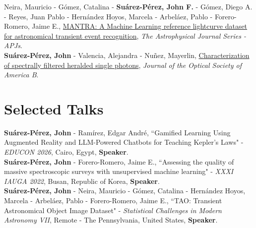 \documentclass[10pt, a4paper]{article}
\newcommand{\years}[1]{\marginnote{\scriptsize #1}}
\begin{document}
\years{2020}Neira, Mauricio - Gómez, Catalina - \textbf{Suárez-Pérez, John F.} - Gómez, Diego A. - Reyes, Juan Pablo - Hernández Hoyos, Marcela - Arbeláez, Pablo - Forero-Romero, Jaime E., \href{https://iopscience.iop.org/article/10.3847/1538-4365/aba267/pdf}{MANTRA: A Machine Learning reference lightcurve dataset for astronomical transient event recognition}, \emph{The Astrophysical Journal Series - APJs}.
\\

\years{2020}\textbf{Suárez-Pérez, John} - Valencia, Alejandra - Nuñez, Mayerlin, \href{https://doi.org/10.1364/JOSAB.387118}{Characterization of spectrally filtered heralded single photons}, \emph{Journal of the Optical Society of America B}.

\section*{Selected Talks}

\years{2026}\textbf{Suárez-Pérez, John} - Ramírez, Edgar André, “Gamified Learning Using Augmented Reality and LLM-Powered Chatbots for Teaching Kepler's Laws" - \emph{EDUCON 2026},  Cairo, Egypt, \textbf{Speaker}.\\

\years{2022}\textbf{Suárez-Pérez, John} - Forero-Romero, Jaime E., “Assessing the quality of massive spectroscopic surveys with unsupervised machine learning" - \emph{XXXI IAUGA 2022},  Busan, Republic of Korea, \textbf{Speaker}.\\


\years{2021}\textbf{Suárez-Pérez, John} - Neira, Mauricio - Gómez, Catalina - Hernández Hoyos, Marcela - Arbeláez, Pablo - Forero-Romero, Jaime E., “TAO: Transient Astronomical Object Image Dataset" - \emph{Statistical Challenges in Modern Astronomy VII}, Remote - The Pennsylvania, United States, \textbf{Speaker}.\\ 
\end{document}

